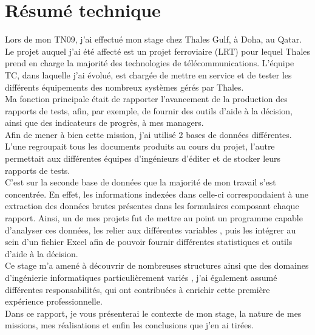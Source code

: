 \chapter*{Résumé technique}

Lors de mon TN09, j'ai effectué mon stage chez Thales Gulf, à Doha, au Qatar. Le projet auquel j'ai été affecté est un projet ferroviaire (\gls{LRT}) pour lequel Thales prend en charge la majorité des technologies de télécommunications. L'équipe \gls{TC}, dans laquelle j'ai évolué, est chargée de mettre en service et de tester les différents équipements des nombreux systèmes gérés par Thales. \\
Ma fonction principale était de rapporter l'avancement de la production des rapports de tests, afin, par exemple, de fournir des outils d'aide à la décision, ainsi que des indicateurs de progrès, à mes managers. \\
Afin de mener à bien cette mission, j'ai utilisé 2 bases de données différentes. L'une regroupait tous les documents produits au cours du projet, l'autre permettait aux différentes équipes d'ingénieurs d'éditer et de stocker leurs rapports de tests. \\
C'est sur la seconde base de données que la majorité de mon travail s'est concentrée. En effet, les informations indexées dans celle-ci correspondaient à une extraction des données brutes présentes dans les formulaires composant chaque rapport. Ainsi, un de mes projets fut de mettre au point un programme capable d'analyser ces données, les relier aux différentes variables , puis les intégrer au sein d'un fichier Excel afin de pouvoir fournir différentes statistiques et outils d'aide à la décision.\\
Ce stage m'a amené à découvrir de nombreuses structures ainsi que des domaines d'ingénierie informatiques particulièrement variés , j'ai également assumé différentes responsabilités, qui ont contribuées à enrichir cette première expérience professionnelle. \\
Dans ce rapport, je vous présenterai le contexte de mon stage, la nature de mes missions, mes réalisations et enfin les conclusions que j'en ai tirées.
